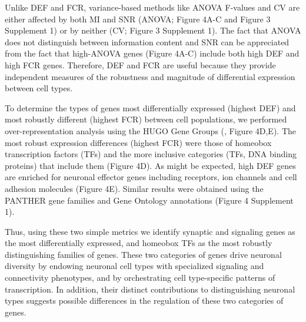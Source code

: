 Unlike DEF and FCR, variance-based methods like ANOVA F-values and CV are either affected by both MI and SNR (ANOVA; Figure 4A-C and Figure 3 Supplement 1) or by neither (CV; Figure 3 Supplement 1). The fact that ANOVA does not distinguish between information content and SNR can be appreciated from the fact that high-ANOVA genes (Figure 4A-C) include both high DEF and high FCR genes. Therefore, DEF and FCR are useful because they provide independent measures of the robustness and magnitude of differential expression between cell types.

To determine the types of genes most differentially expressed (highest DEF) and most robustly different (highest FCR) between cell populations, we performed over-representation analysis using the HUGO Gene Groups (\citealt{Braschi_2018}, Figure 4D,E). The most robust expression differences (highest FCR) were those of homeobox transcription factors (TFs) and the more inclusive categories (TFs, DNA binding proteins) that include them (Figure 4D). As might be expected, high DEF genes are enriched for neuronal effector genes including receptors, ion channels and cell adhesion molecules (Figure 4E). Similar results were obtained using the PANTHER gene families \citep{Mi_2016} and Gene Ontology annotations\cite{Ashburner_2000} (Figure 4 Supplement 1).  

Thus, using these two simple metrics we identify synaptic and signaling genes as the most differentially expressed, and homeobox TFs as the most robustly distinguishing families of genes. These two categories of genes drive neuronal diversity by endowing neuronal cell types with specialized signaling and connectivity phenotypes, and by orchestrating cell type-specific patterns of transcription. In addition, their distinct contributions to distinguishing neuronal types suggests possible differences in the regulation of these two categories of genes. 


